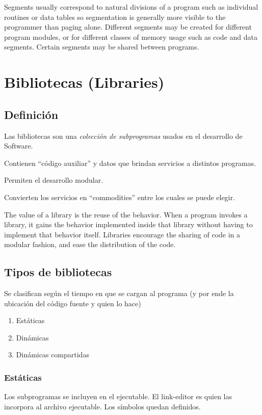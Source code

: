 \documentclass[a4paper, twoside]{article}
\begin{document}
Segments usually correspond to natural divisions of a program such as individual routines or data tables so segmentation is generally more visible to the programmer than paging alone. Different segments may be created for different program modules, or for different classes of memory usage such as code and data segments. Certain segments may be shared between programs.

\newpage
\section{Bibliotecas (Libraries)}
\subsection{Definición}
Las bibliotecas son una \emph{colección de subprogramas} usados en el desarrollo de Software.

Contienen “código auxiliar” y datos que brindan servicios a distintos programas.

Permiten el desarrollo modular.

Convierten los servicios en “commodities” entre los cuales se puede elegir.

The value of a library is the reuse of the behavior. When a program invokes a library, it gains the behavior implemented inside that library without having to implement that behavior itself. Libraries encourage the sharing of code in a modular fashion, and ease the distribution of the code.

\subsection{Tipos de bibliotecas}
Se clasifican según el tiempo en que se cargan al programa (y por ende la ubicación del código fuente y quien lo hace)
\begin{enumerate}
	\item Estáticas
	\item Dinámicas
	\item Dinámicas compartidas
\end{enumerate}

\subsubsection{Estáticas}
Los subprogramas se incluyen en el ejecutable. El link-editor es quien las incorpora al archivo ejecutable. Los símbolos quedan definidos.
\end{document}
